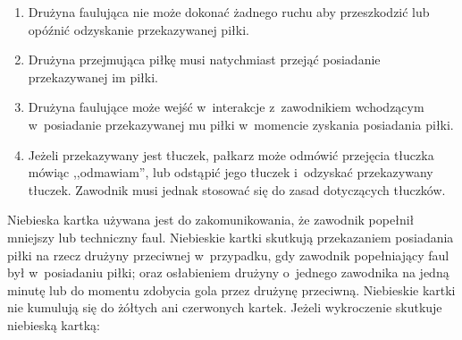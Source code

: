\documentclass[12pt,a4paper]{article}
\renewcommand{\paragraph}[1]{
  \oldparagraph{#1}%
  \leftskip2.8cm
}
\begin{document}
\begin{enumerate}
	      \begin{enumerate}
		      \item
		            Drużyna faulująca nie może dokonać żadnego ruchu aby przeszkodzić
		            lub opóźnić odzyskanie przekazywanej piłki.
		      \item
		            Drużyna przejmująca piłkę musi natychmiast przejąć posiadanie
		            przekazywanej im piłki.
		      \item
		            Drużyna faulujące może wejść w~interakcje z~zawodnikiem wchodzącym w~posiadanie przekazywanej mu piłki w~momencie zyskania posiadania
		            piłki.
		      \item
		            Jeżeli przekazywany jest tłuczek, pałkarz może odmówić przejęcia
		            tłuczka mówiąc ,,odmawiam'', lub odstąpić jego tłuczek i~odzyskać
		            przekazywany tłuczek. Zawodnik musi jednak stosować się do zasad
		            dotyczących tłuczków.
	      \end{enumerate}
\end{enumerate}

\paragraph{Niebieska kartka}
Niebieska kartka używana jest do
zakomunikowania, że zawodnik popełnił mniejszy lub techniczny faul.
Niebieskie kartki skutkują przekazaniem posiadania piłki na rzecz
drużyny przeciwnej w~przypadku, gdy zawodnik popełniający faul był w~posiadaniu piłki; oraz osłabieniem drużyny o~jednego zawodnika na jedną
minutę lub do momentu zdobycia gola przez drużynę przeciwną. Niebieskie
kartki nie kumulują się do żółtych ani czerwonych kartek. Jeżeli
wykroczenie skutkuje niebieską kartką:
\end{document}
